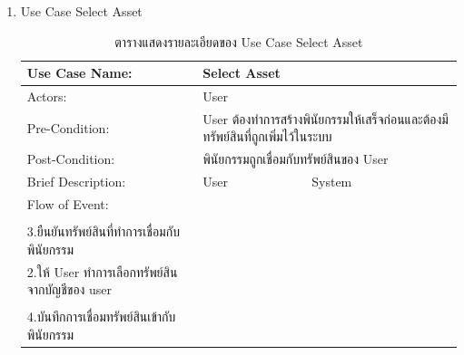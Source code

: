 \documentclass[12pt,oneside,openright,a4paper]{cpe-thai-project}
\begin{document}
\begin{enumerate}[label=\thesubsection.\arabic*,leftmargin=0pt,itemindent=1.25cm]
\begin{table}[h]
\begin{tabularx}{\textwidth}{|l|X|X|}
\hline
\end{tabularx}
\end{table}
	\FloatBarrier
\item Use Case Select Asset
	\begin{table}[h]
\centering
\caption{ตารางแสดงรายละเอียดของ Use Case Select Asset}
\begin{tabularx}{\textwidth}{|l|X|X|} 
\hline
Use Case Name:     & \multicolumn{2}{l|}{Select Asset}                                                                                                                                                                                                                           \\ 
\hline
Actors:            & \multicolumn{2}{l|}{User}                                                                                                                                                                                                                                   \\ 
\hline
Pre-Condition:     & \multicolumn{2}{l|}{User ต้องทำการสร้างพินัยกรรมให้เสร็จก่อนและต้องมีทรัพย์สินที่ถูกเพิ่มไว้ในระบบ}                                                                                                                                                         \\ 
\hline
Post-Condition:    & \multicolumn{2}{l|}{พินัยกรรมถูกเชื่อมกับทรัพย์สินของ
  User}                                                                                                                                                                                               \\ 
\hline
Brief Description: & User                                                                                                             & System                                                                                                                                   \\ 
\hline
Flow of Event:     & \begin{tabular}[c]{@{}l@{}}1.เลือกเมนู Select Asset \\\\3.ยืนยันทรัพย์สินที่ทำการเชื่อมกับพินัยกรรม\end{tabular} & \begin{tabular}[c]{@{}l@{}}\\2.ให้ User ทำการเลือกทรัพย์สินจากบัญชีของ user \\\\4.บันทึกการเชื่อมทรัพย์สินเข้ากับพินัยกรรม\end{tabular}  \\ 

\end{tabularx}
\end{table}
\end{enumerate}
\end{document}
